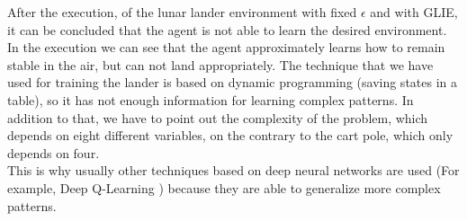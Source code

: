 \documentclass[12pt]{article}
\begin{document}
After the execution, of the lunar lander environment with fixed $\epsilon$ and with GLIE, it can be concluded that the agent is not able to learn the desired environment. \\

In the execution we can see that the agent approximately learns how to remain stable in the air, but can not land appropriately. The technique that we have used for training the lander is based on dynamic programming (saving states in a table), so it has not enough information for learning complex patterns. In addition to that, we have to point out the complexity of the problem, which depends on eight different variables, on the contrary to the cart pole, which only depends on four.\\

This is why usually other techniques based on deep neural networks are used (For example, Deep Q-Learning \cite{deep-q-learning}) because they are able to generalize more complex patterns.


\end{document}
